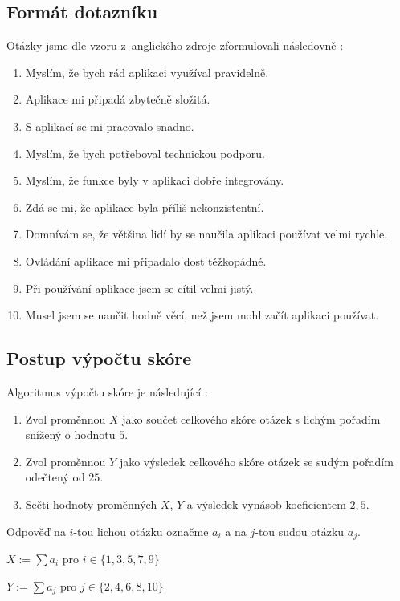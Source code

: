 \documentclass[12pt,a4paper]{report}
\begin{document}
\subsection{Formát dotazníku}
Otázky jsme dle vzoru z~anglického zdroje zformulovali následovně \citep{sus-adobe}:

\begin{enumerate}
    \item Myslím, že bych rád aplikaci využíval pravidelně.
    \item Aplikace mi připadá zbytečně složitá.
    \item S aplikací se mi pracovalo snadno.
    \item Myslím, že bych potřeboval technickou podporu.
    \item Myslím, že funkce byly v aplikaci dobře integrovány.
    \item Zdá se mi, že aplikace byla příliš nekonzistentní.
    \item Domnívám se, že většina lidí by se naučila aplikaci používat velmi rychle.
    \item Ovládání aplikace mi připadalo dost těžkopádné.
    \item Při používání aplikace jsem se cítil velmi jistý.
    \item Musel jsem se naučit hodně věcí, než jsem mohl začít aplikaci používat.
\end{enumerate}

\subsection{Postup výpočtu skóre}

Algoritmus výpočtu skóre je následující \citep{sus-adobe}:

\begin{enumerate}
    \item Zvol proměnnou $X$ jako součet celkového skóre otázek s lichým pořadím snížený o hodnotu $5$.
    \item Zvol proměnnou $Y$ jako výsledek celkového skóre otázek se sudým pořadím odečtený od $25$.
    \item Sečti hodnoty proměnných $X$, $Y$ a výsledek vynásob koeficientem $2,5$.
\end{enumerate}

Odpověď na $i$-tou lichou otázku označme $a_i$ a na $j$-tou sudou otázku $a_j$.

$X := \sum a_i$ pro $i \in \{1,3,5,7,9\}$

$Y := \sum a_j$ pro $j \in \{2,4,6,8,10\}$
\end{document}

